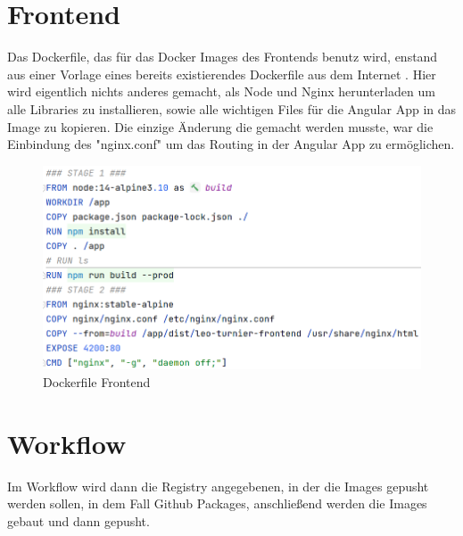 \section{Frontend}

Das Dockerfile, das für das Docker Images des Frontends benutz wird, enstand aus einer Vorlage eines bereits existierendes Dockerfile aus dem Internet \cite{deployment-dockerfile-1}.
Hier wird eigentlich nichts anderes gemacht, als Node und Nginx herunterladen um alle Libraries zu installieren, sowie alle wichtigen Files für die Angular App in das Image zu kopieren.
Die einzige Änderung die gemacht werden musste, war die Einbindung des "nginx.conf" um das Routing in der Angular App zu ermöglichen.

\begin{figure}[H]
    \includegraphics[scale=0.44]{pics/docker/dockerfile_frontend.png}
    \caption{Dockerfile Frontend}
\end{figure}

\section{Workflow}

Im Workflow wird dann die Registry angegebenen, in der die Images gepusht werden sollen, in dem Fall Github Packages, anschließend werden die Images gebaut und dann gepusht.

